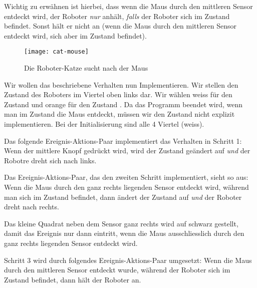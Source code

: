 Wichtig zu erwähnen ist hierbei, dass wenn die Maus durch den mittleren Sensor entdeckt wird, der Roboter \emph{nur} anhält, \emph{falls} der Roboter sich im Zustand  befindet. Sonst hält er nicht an (wenn die Maus durch den mittleren Sensor entdeckt wird, sich aber im Zustand  befindet). 


\begin{figure}
	\begin{center}
		\texttt{[image: cat-mouse]}
		\caption{Die Roboter-Katze sucht nach der Maus}\label{fig.cat-mouse}
	\end{center}
\end{figure}

Wir wollen das beschriebene Verhalten nun Implementieren. Wir stellen den Zustand des Roboters im Viertel oben links dar. Wir wählen weiss für den Zustand  und orange für den Zustand .
Da das Programm beendet wird, wenn man im Zustand  die Maus entdeckt, müssen wir den Zustand  nicht explizit implementieren.
Bei der Initialisierung sind alle 4 Viertel  (weiss).

Das folgende Ereignis-Aktions-Paar implementiert das Verhalten in Schritt 1: 
Wenn der mittlere Knopf gedrückt wird, wird der Zustand geändert auf 
\emph{und} der Robotre dreht sich nach links.

Das Ereignis-Aktions-Paar, das den zweiten Schritt implementiert, sieht so aus:
Wenn die Maus durch den ganz rechts liegenden Sensor entdeckt wird, während man sich im Zustand  befindet, dann ändert der Zustand auf  \emph{und} der Roboter dreht nach rechts.

Das kleine Quadrat neben dem Sensor ganz rechts wird auf schwarz gestellt, damit das Ereignis nur dann eintritt, wenn die Maus ausschliesslich durch den ganz rechts liegenden Sensor entdeckt wird. 

Schritt 3 wird durch folgendes Ereignis-Aktions-Paar umgesetzt:
Wenn die Maus durch den mittleren Sensor entdeckt wurde, während der Roboter sich im Zustand  befindet, dann hält der Roboter an. 


